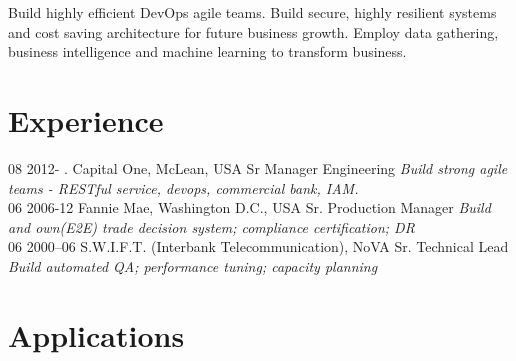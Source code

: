 \documentclass[]{friggeri-cv}
\begin{document}
Build highly efficient DevOps agile teams. Build secure, highly resilient systems and cost saving architecture for future business growth. Employ data gathering, business intelligence and machine learning to transform business.

\section{Experience}
\begin{entrylist}
  \entry
    {08 2012- .}
    {Capital One, McLean, USA}
    {Sr Manager Engineering}
    {\emph{Build strong agile teams - RESTful service, devops, commercial bank, IAM.}\\}
  \entry
    {06 2006-12}
    {Fannie Mae, Washington D.C., USA}
    {Sr. Production Manager}
    {\emph{Build and own(E2E) trade decision system; compliance certification; DR}\\}
  \entry
    {06 2000–06}
    {S.W.I.F.T.  (Interbank Telecommunication), NoVA}
    {Sr. Technical Lead}
    {\emph{Build automated QA; performance tuning; capacity planning}\\}
\end{entrylist}

\section{Applications}
\end{document}
